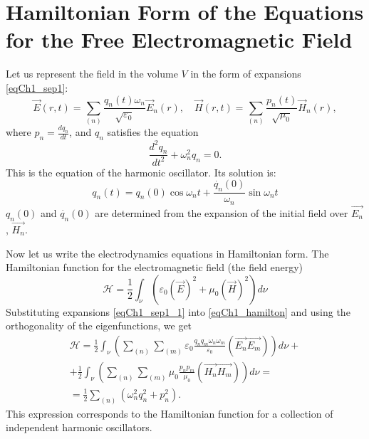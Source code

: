 \section{Hamiltonian Form of the Equations for the Free Electromagnetic Field}
Let us represent the field in the volume $V$ in the form of expansions \eqref{eqCh1_sep1}:
\begin{equation}
\vec{E}\left(r, t\right) = \sum_{(n)}
\frac{q_n\left(t\right) \omega_n}{\sqrt{\varepsilon_0}} \vec{E}_n\left(r\right),
\quad
\vec{H}\left(r, t\right) = \sum_{(n)}
\frac{p_n\left(t\right)}{\sqrt{\mu_0}} \vec{H}_n\left(r\right),
\label{eqCh1_sep1_1}
\end{equation}
where $p_n = \frac{d q_n}{d t}$, and $q_n$ satisfies the equation
\[
\frac{d^2 q_n}{d t^2} + \omega_n^2 q_n = 0.
\]
This is the equation of the harmonic oscillator. Its solution is:
\begin{equation}
q_n\left(t\right) = q_n\left(0\right) \cos \omega_n t + 
\frac{\dot{q_n}\left(0\right)}{\omega_n} \sin \omega_n t 
\end{equation}
$q_n\left(0\right)$ and 
$\dot{q_n}\left(0\right)$ 
are determined from the expansion of the initial field over  
$\vec{E_n}$, $\vec{H_n}$.
 
Now let us write the electrodynamics equations in Hamiltonian
form. The Hamiltonian function for the electromagnetic field 
(the field energy)
\begin{equation}
\mathcal{H} = \frac{1}{2}
\int_{\nu}\left( \varepsilon_0\left(\vec{E}\right)^2 + \mu_0
\left(\vec{H}\right)^2\right) d\nu
\label{eqCh1_hamilton}
\end{equation}
Substituting expansions \eqref{eqCh1_sep1_1} into \eqref{eqCh1_hamilton} and
using the orthogonality of the eigenfunctions, we get 
\begin{eqnarray}
\mathcal{H} = \frac{1}{2} 
\int_{\nu}\left( \sum_{(n)} \sum_{(m)}\varepsilon_0
\frac{q_n q_m \omega_n \omega_m}{\varepsilon_0}
\left( \vec{E_n} \vec{E_m}\right)
\right) d\nu +
\nonumber \\
+  \frac{1}{2} 
\int_{\nu}\left( \sum_{(n)} \sum_{(m)}\mu_0
\frac{p_n p_m}{\mu_0}
\left( \vec{H_n} \vec{H_m}\right)
\right) d\nu =
\nonumber \\
= \frac{1}{2}\sum_{(n)}\left(\omega_n^2 q_n^2 + p_n^2\right).
\end{eqnarray}
This expression corresponds to the Hamiltonian function for a collection
of independent harmonic oscillators. 


